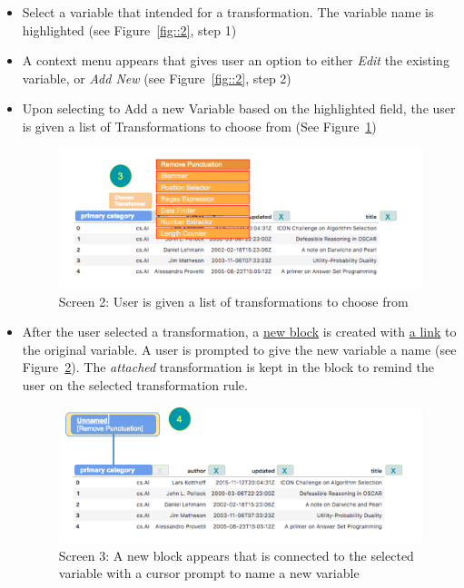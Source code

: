 \documentclass[12pt,letterpaper]{article}
\begin{document}
\begin{itemize}
    \item Select a variable that intended for a transformation. The variable name is highlighted (see Figure~\ref{fig::2}, step 1)
    \item A context menu appears that gives user an option to either \textit{Edit} the existing variable, or \textit{Add New}  (see Figure~\ref{fig::2}, step 2)
    \item Upon selecting to Add a new Variable based on the highlighted field, the user is given a list of Transformations to choose from (See Figure~\ref{fig::3})
    
\begin{figure}[h]
\centering
\includegraphics[scale=.3]{figures/m3/wireframe-screen2.png}
\caption{Screen 2: User is given a list of transformations to choose from}
\label{fig::3}
\end{figure}

    \item After the user selected a transformation, a \underline{new block} is created with \underline{a link} to the original variable. A user is prompted to give the new variable a name (see Figure~\ref{fig::4}). The \textit{attached} transformation is kept in the block to remind the user on the selected transformation rule. 
    
    
\begin{figure}[h]
\centering
\includegraphics[scale=.3]{figures/m3/wireframe-screen3.png}
\caption{Screen 3: A new block appears that is connected to the selected variable with a cursor prompt to name a new variable}
\label{fig::4}
\end{figure}


\end{itemize}
\end{document}
